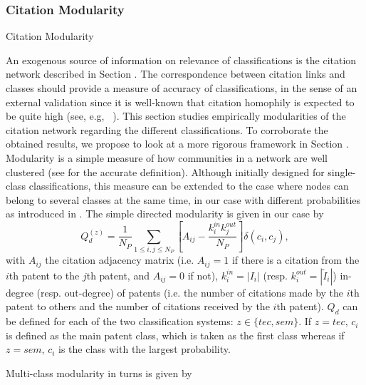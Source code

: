 \subsubsection*{Citation Modularity}{Citation Modularity}
\label{citationmodularity}

An exogenous source of information on relevance of classifications is the citation network described in Section . The correspondence between citation links and classes should provide a measure of accuracy of classifications, in the sense of an external validation since it is well-known that citation homophily  is expected to be quite high (see, e.g, ~\cite{AAKnetwork2016}). This section studies empirically modularities of the citation network regarding the different classifications. To corroborate the obtained results, we propose to look at a more rigorous framework in Section . Modularity is a simple measure of how communities in a network are well clustered (see \cite{clauset2004finding} for the accurate definition). Although initially designed for single-class classifications, this measure can be extended to the case where nodes can belong to several classes at the same time, in our case with different probabilities as introduced in \cite{nicosia2009extending}. The simple directed modularity is given in our case by
\[
Q_d^{(z)} = \displaystyle \frac{1}{N_P}\sum_{1\leq i,j\leq N_P}\left[A_{ij} - \frac{k_{i}^{in}k_{j}^{out}}{N_P}\right]\delta(c_i,c_j),
\]
with $A_{ij}$ the citation adjacency matrix (i.e. $A_{ij} = 1$ if there is a citation from the $i$th patent to the $j$th patent, and $A_{ij}=0$ if not), $k_i^{in}=\left| I_i\right|$ (resp. $k_i^{out}= \left|\tilde{I}_i \right|$) in-degree (resp. out-degree) of patents (i.e. the number of citations made by the $i$th patent to others and the number of citations received by the $i$th patent). $Q_d$ can be defined for each of the two classification systems: $z \in \{tec, sem\}$. If $z=tec$, $c_i$ is defined as the main patent class, which is taken as the first class whereas if $z=sem$, $c_i$ is the class with the largest probability.

Multi-class modularity in turns is given by

